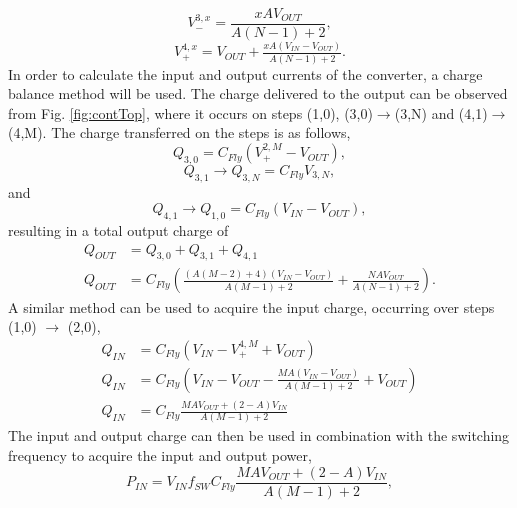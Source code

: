\documentclass[conference]{IEEEtran}
\begin{document}
	\begin{equation}
	V_{-}^{3,x} = \frac{xAV_{OUT}}{A(N-1) + 2},
	\end{equation}
	\begin{equation}
	V_{+}^{4,x} = V_{OUT} + \tfrac{xA(V_{IN} -V_{OUT})}{A(N-1) + 2}.
	\end{equation}
	In order to calculate the input and output currents of the converter, a charge balance method will be used. The charge delivered to the output can be observed from Fig. \ref{fig:contTop}, where it occurs on steps (1,0), (3,0)$\rightarrow$(3,N) and (4,1)$\rightarrow$(4,M). The charge transferred on the steps is as follows,
	\begin{equation}
	Q_{3,0} = C_{Fly}(V_+^{2,M} - V_{OUT}),
	\end{equation}
	\begin{equation}
	Q_{3,1} \rightarrow  Q_{3,N} = C_{Fly}V_{3,N},
	\end{equation}
	and
	\begin{equation}
	Q_{4,1} \rightarrow  Q_{1,0} = C_{Fly}(V_{IN} - V_{OUT}),
	\end{equation}
	resulting in a total output charge of 
	\begin{equation}
	\begin{split}
	Q_{OUT}\! &= Q_{3,0} + Q_{3,1} + Q_{4,1}\\
	Q_{OUT}\! &= \! C_{Fly}\!\left(\tfrac{(A(M-2) + 4)(V_{IN} - V_{OUT})}{A(M-1) + 2}\! + \! \tfrac{NAV_{OUT}}{A(N-1) + 2}\right).
	\end{split}
 	\end{equation}
 	A similar method can be used to acquire the input charge, occurring over steps (1,0) $\rightarrow$ (2,0),
 	\begin{equation}
 	\begin{split}
 	Q_{IN} &= C_{Fly}\left(V_{IN} - V_+^{4,M} + V_{OUT}\right) \\
 	Q_{IN} &= C_{Fly}\!\left(V_{IN} - V_{OUT} - \tfrac{MA(V_{IN}\! -\!V_{OUT})}{A(M-1) + 2} + V_{OUT}\!\right) \\
 	Q_{IN} &= C_{Fly}\tfrac{MAV_{OUT} + (2-A)V_{IN}}{A(M-1) + 2}
 	\end{split}
 	\end{equation}
 	The input and output charge can then be used in combination with the switching frequency to acquire the input and output power,
 	\begin{equation}
 	P_{IN} = V_{IN}f_{SW}C_{Fly}\frac{MAV_{OUT} + (2-A)V_{IN}}{A(M-1) + 2},
 	\label{eq:P_IN}
 	\end{equation}
 	
\end{document}
